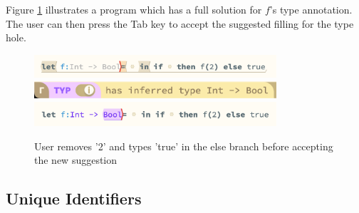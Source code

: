 Figure \ref{fig:editor_ghost} illustrates a program which has a full solution for $f$'s type annotation. The user can then press the Tab key to accept the suggested filling for the type hole.
\begin{figure}[H]
\includegraphics[width=9cm]{images/example_ghost.png}
\includegraphics[width=9cm]{images/example_complete_CI.png}
\includegraphics[width=9cm]{images/example_complete.png}
\caption{User removes '2' and types 'true' in the else branch before accepting the new suggestion}
\label{fig:editor_ghost}
\end{figure}

\subsection{Unique Identifiers}

